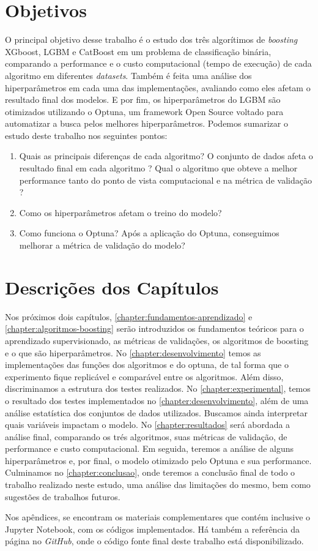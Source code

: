 \section{Objetivos}
O principal objetivo desse trabalho é o estudo dos três algorítimos de \textit{boosting} XGboost, LGBM e CatBoost em um problema de classificação binária, comparando a performance e o custo computacional (tempo de execução) de cada algoritmo em diferentes \textit{datasets}. Também é feita uma análise dos hiperparâmetros em cada uma das implementações, avaliando como eles afetam o resultado final dos modelos. E por fim, os hiperparâmetros do LGBM são otimizados utilizando o Optuna, um framework Open Source voltado para automatizar a busca pelos melhores hiperparâmetros. Podemos sumarizar o estudo deste trabalho nos seguintes pontos:
\begin{enumerate}
   \item Quais as principais diferenças de cada algoritmo? O conjunto de dados afeta o resultado final em cada algoritmo ? Qual o algoritmo que obteve a melhor performance tanto do ponto de vista computacional e na métrica de validação ?
   \item Como os hiperparâmetros afetam o treino do modelo? 
   \item Como funciona o Optuna? Após a aplicação do Optuna, conseguimos melhorar a métrica de validação do modelo?
\end{enumerate}

\section{Descrições dos Capítulos}
Nos próximos dois capítulos, \autoref{chapter:fundamentos-aprendizado} e \autoref{chapter:algoritmos-boosting} serão introduzidos os fundamentos teóricos para o aprendizado supervisionado, as métricas de validações, os algoritmos de boosting e o que são hiperparâmetros. No \autoref{chapter:desenvolvimento} temos as implementações das funções dos algoritmos e do optuna, de tal forma que o experimento fique replicável e comparável entre os algoritmos. Além disso, discriminamos a estrutura dos testes realizados. No \autoref{chapter:experimental}, temos o resultado dos testes implementados no \autoref{chapter:desenvolvimento}, além de uma análise estatística dos conjuntos de dados utilizados. Buscamos ainda interpretar quais variáveis impactam o modelo. No \autoref{chapter:resultados} será abordada a análise final, comparando os trés algoritmos, suas métricas de validação, de performance e custo computacional. Em seguida, teremos a análise de alguns hiperparâmetros e, por final, o modelo otimizado pelo Optuna e sua performance. Culminamos no \autoref{chapter:conclusao}, onde teremos a conclusão final de todo o trabalho realizado neste estudo, uma análise das limitações do mesmo, bem como sugestões de trabalhos futuros.

Nos apêndices, se encontram os materiais complementares que contém inclusive o Jupyter Notebook, com os códigos implementados. Há também a  referência da página no \textit{GitHub}, onde o código fonte final deste trabalho está disponibilizado. 
